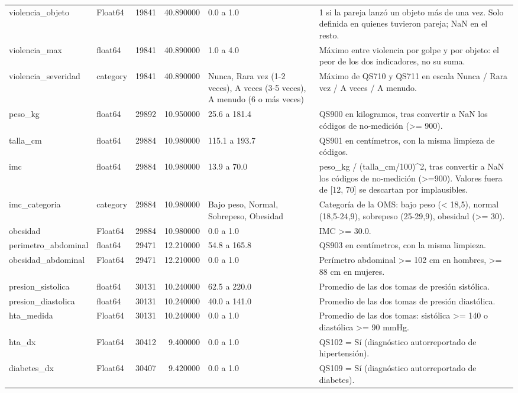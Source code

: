 \begin{longtable}{llrrll}
violencia\_objeto & Float64 & 19841 & 40.890000 & 0.0 a 1.0 & 1 si la pareja lanzó un objeto más de una vez. Solo definida en quienes tuvieron pareja; NaN en el resto. \\
violencia\_max & float64 & 19841 & 40.890000 & 1.0 a 4.0 & Máximo entre violencia por golpe y por objeto: el peor de los dos indicadores, no su suma. \\
violencia\_severidad & category & 19841 & 40.890000 & Nunca, Rara vez (1-2 veces), A veces (3-5 veces), A menudo (6 o más veces) & Máximo de QS710 y QS711 en escala Nunca / Rara vez / A veces / A menudo. \\
peso\_kg & float64 & 29892 & 10.950000 & 25.6 a 181.4 & QS900 en kilogramos, tras convertir a NaN los códigos de no-medición (>= 900). \\
talla\_cm & float64 & 29884 & 10.980000 & 115.1 a 193.7 & QS901 en centímetros, con la misma limpieza de códigos. \\
imc & float64 & 29884 & 10.980000 & 13.9 a 70.0 & peso\_kg / (talla\_cm/100)\textasciicircum 2, tras convertir a NaN los códigos de no-medición (>=900). Valores fuera de [12, 70] se descartan por implausibles. \\
imc\_categoria & category & 29884 & 10.980000 & Bajo peso, Normal, Sobrepeso, Obesidad & Categoría de la OMS: bajo peso (< 18,5), normal (18,5-24,9), sobrepeso (25-29,9), obesidad (>= 30). \\
obesidad & Float64 & 29884 & 10.980000 & 0.0 a 1.0 & IMC >= 30.0. \\
perimetro\_abdominal & float64 & 29471 & 12.210000 & 54.8 a 165.8 & QS903 en centímetros, con la misma limpieza. \\
obesidad\_abdominal & Float64 & 29471 & 12.210000 & 0.0 a 1.0 & Perímetro abdominal >= 102 cm en hombres, >= 88 cm en mujeres. \\
presion\_sistolica & float64 & 30131 & 10.240000 & 62.5 a 220.0 & Promedio de las dos tomas de presión sistólica. \\
presion\_diastolica & float64 & 30131 & 10.240000 & 40.0 a 141.0 & Promedio de las dos tomas de presión diastólica. \\
hta\_medida & Float64 & 30131 & 10.240000 & 0.0 a 1.0 & Promedio de las dos tomas: sistólica >= 140 o diastólica >= 90 mmHg. \\
hta\_dx & Float64 & 30412 & 9.400000 & 0.0 a 1.0 & QS102 = Sí (diagnóstico autorreportado de hipertensión). \\
diabetes\_dx & Float64 & 30407 & 9.420000 & 0.0 a 1.0 & QS109 = Sí (diagnóstico autorreportado de diabetes). \\

\end{longtable}
